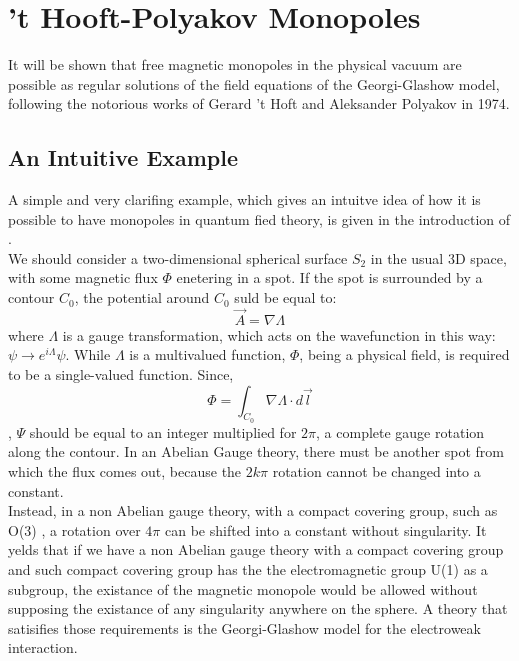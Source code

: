 \documentclass[main.tex]{subfiles}
\begin{document}
\section{’t Hooft-Polyakov Monopoles}
%
It will be shown that free magnetic monopoles in the physical vacuum are possible as regular solutions of the field equations of the Georgi-Glashow model, following the notorious works of Gerard 't Hoft \cite{Hof:Mon} and Aleksander Polyakov \cite{Pol:Mon} in 1974.

\subsection{An Intuitive Example}
%
A simple and very clarifing example, which gives an intuitve idea of how it is possible to have monopoles in quantum fied theory, is given in the introduction of \cite{Hof:Mon}. \\
We should consider a two-dimensional spherical surface $S_2$ in the usual 3D space, with some magnetic flux $\Phi$ enetering in a spot. If the spot is surrounded by a contour $C_0$, the potential around $C_0$ suld be equal to:
\begin{equation}
    \Vec{A}= \nabla \Lambda
\end{equation}
where $\Lambda$ is a gauge transformation, which acts on the wavefunction in this way: $\psi \rightarrow e^{i\Lambda} \psi $.
While $\Lambda$ is a multivalued function, $\Phi$, being a physical field, is required to be a single-valued function. Since,
\begin{equation}
    \Phi = \int_{C_0} \nabla \Lambda \cdot d\Vec{l}
\end{equation},
$\Psi$ should be equal to an integer multiplied for $2 \pi  $, a complete gauge rotation along the contour.
In an Abelian Gauge theory, there must be another spot from which the flux comes out, because the $2k \pi$ rotation cannot be changed into a constant. \\
Instead, in a non Abelian gauge theory, with a compact covering group, such as O(3) , a rotation over $4\pi$ can be shifted into a constant without singularity.
It yelds that if we have a non Abelian gauge theory with a compact covering group and such compact covering group has the the electromagnetic group  U(1) as a subgroup, the existance of the magnetic monopole would be allowed without supposing the existance of any singularity anywhere on the sphere.
A theory that satisifies those requirements is the Georgi-Glashow model for the electroweak interaction.
\end{document}
